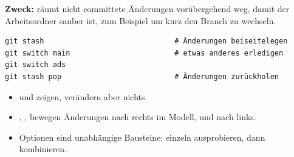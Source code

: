 
\textbf{Zweck:} räumt nicht committete Änderungen vorübergehend weg, damit der Arbeitsordner
sauber ist, zum Beispiel um kurz den Branch zu wechseln.

\begin{lstlisting}[style=befehle]
git stash                              # Änderungen beiseitelegen
git switch main                        # etwas anderes erledigen
git switch ads
git stash pop                          # Änderungen zurückholen
\end{lstlisting}

\begin{zusammenfassung}
\begin{itemize}[nosep]
  \item {} und  zeigen, verändern aber nichts.
  \item {}, ,  bewegen Änderungen nach rechts im Modell,
         und  nach links.
  \item Optionen sind unabhängige Bausteine: einzeln ausprobieren, dann kombinieren.
\end{itemize}
\end{zusammenfassung}
